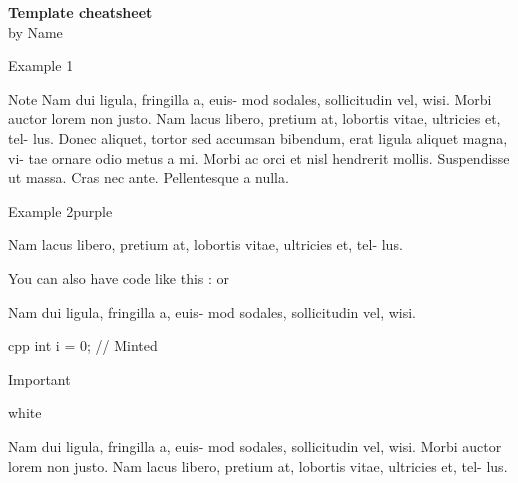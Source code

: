 \documentclass[10pt, a4paper, landscape]{article}
\begin{document}
	
\begin{onehalfspace}
	
	\begin{multicols*}{4}
	
		\begin{flushleft}
			\LARGE{\bf{\textcolor{\mainColor}{\textbf{Template cheatsheet}}}} \\
			\large{by \textcolor{\mainColor}{Name}}
		\end{flushleft}
		
		\begin{Text}{Example 1}
			 \lipsum[1]
			
			\begin{Note}{Note}
				Nam dui ligula, fringilla a, euis-
				mod sodales, sollicitudin vel, wisi. Morbi
				auctor lorem non justo. Nam lacus libero,
				pretium at, lobortis vitae, ultricies et, tel-
				lus.
				 Donec aliquet, tortor sed accumsan
				bibendum, erat ligula aliquet magna, vi-
				tae ornare odio metus a mi. Morbi ac
				orci et nisl hendrerit mollis. Suspendisse
				ut massa. Cras nec ante. Pellentesque
				a nulla. 
			
			\end{Note}
		
			\lipsum[3-4]
		\end{Text}
	
		\begin{TextColor}{Example 2}{purple}		
			
			Nam lacus libero,
			pretium at, lobortis vitae, ultricies et, tel-
			lus.
			
			
			You can also have code like this :  or 
			
			Nam dui ligula, fringilla a, euis-
			mod sodales, sollicitudin vel, wisi.
			
			
\begin{CodeMinted}{cpp}
int i = 0; // Minted
\end{CodeMinted}
			
			\begin{Important}{Important}
				
				\begin{List}{white}
					\item Nam dui ligula, fringilla a, euis-
					mod sodales, sollicitudin vel, wisi. Morbi
					auctor lorem non justo.
					Nam lacus libero,
					pretium at, lobortis vitae, ultricies et, tel-
					lus.
					

\end{List}
\end{Important}
\end{TextColor}
\end{multicols*}
\end{onehalfspace}
\end{document}
